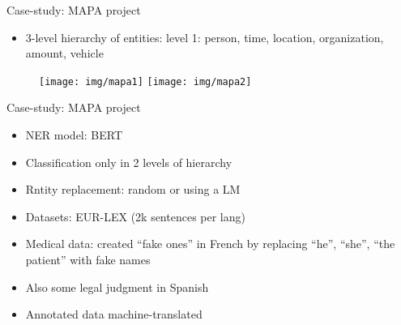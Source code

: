 \documentclass[12pt,aspectratio=169,handout]{beamer}
\begin{document}
\begin{frame}{Case-study: MAPA project}

\begin{itemize}
\item 3-level hierarchy of entities: level 1: person, time, location, organization, amount, vehicle
\end{itemize}

\begin{figure}
\texttt{[image: img/mapa1]}
\texttt{[image: img/mapa2]}
\end{figure}



\end{frame}





\begin{frame}{Case-study: MAPA project}

\begin{itemize}
\item  NER model: BERT
\item  Classification only in 2 levels of hierarchy
\item  Rntity replacement: random or using a LM
\item  Datasets: EUR-LEX (2k sentences per lang)
\item  Medical data: created “fake ones” in French by replacing “he”, “she”, “the patient” with fake names
\item  Also some legal judgment in Spanish
\item  Annotated data machine-translated
\end{itemize}

\end{frame}
\end{document}
